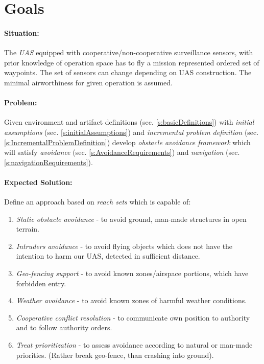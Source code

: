 \setcounter{chapter}{0}
\setcounter{section}{0}
\setcounter{subsection}{0}

\setcounter{chapter}{1}
\setcounter{section}{1}

\section{Goals}
\paragraph{Situation:} The \emph{UAS} equipped with cooperative/non-cooperative surveillance sensors, with prior knowledge of operation space has to fly a mission represented ordered set of waypoints. The set of sensors can change depending on UAS construction. The minimal airworthiness for given operation is assumed.

\paragraph{Problem:} Given environment and artifact definitions (sec. \ref{s:basicDefinitions}) with \emph{initial assumptions} (sec. \ref{s:initialAssumptions}) and \emph{incremental problem definition} (sec. \ref{s:IncrementalProblemDefinition}) develop \emph{obstacle avoidance framework} which will satisfy \emph{avoidance} (sec. \ref{s:AvoidanceRequirements}) and \emph{navigation} (sec. \ref{s:navigationRequirements}).

\paragraph{Expected Solution:} Define an approach based on \emph{reach sets} which is capable of:

\begin{enumerate}
    \item \emph{Static obstacle avoidance} - to avoid ground, man-made structures in open terrain. 
    
    \item \emph{Intruders avoidance} - to avoid flying objects which does not have the intention to harm our UAS, detected in sufficient distance. 

    \item \emph{Geo-fencing support} - to avoid known zones/airspace portions, which have forbidden entry.

    \item \emph{Weather avoidance} - to avoid known zones of harmful weather conditions.

    \item \emph{Cooperative conflict resolution} - to communicate own position to authority and to follow authority orders.
    
    \item \emph{Treat prioritization} - to assess avoidance according to natural or man-made priorities. (Rather break geo-fence, than crashing into ground).
\end{enumerate}

